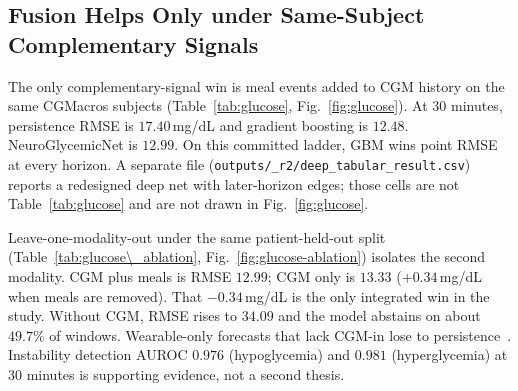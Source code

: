 \subsection{Fusion Helps Only under Same-Subject Complementary Signals}
\label{sec:glucose}

The only complementary-signal win is meal events added to CGM history on the same CGMacros
subjects (Table~\ref{tab:glucose}, Fig.~\ref{fig:glucose}). At 30 minutes, persistence RMSE is
$17.40$\,mg/dL and gradient boosting is $12.48$. NeuroGlycemicNet is $12.99$. On this committed
ladder, GBM wins point RMSE at every horizon. A separate file
(\texttt{outputs/\_r2/deep\_tabular\_result.csv}) reports a redesigned deep net with later-horizon
edges; those cells are not Table~\ref{tab:glucose} and are not drawn in Fig.~\ref{fig:glucose}.

Leave-one-modality-out under the same patient-held-out split
(Table~\ref{tab:glucose\_ablation}, Fig.~\ref{fig:glucose-ablation}) isolates the second modality.
CGM plus meals is RMSE $12.99$; CGM only is $13.33$ ($+0.34$\,mg/dL when meals are removed).
That $-0.34$\,mg/dL is the only integrated win in the study. Without CGM, RMSE rises to $34.09$
and the model abstains on about $49.7\%$ of windows. Wearable-only forecasts that lack CGM-in
lose to persistence~\cite{lu2026glucofmbench}. Instability detection AUROC $0.976$ (hypoglycemia)
and $0.981$ (hyperglycemia) at 30 minutes is supporting evidence, not a second thesis.
